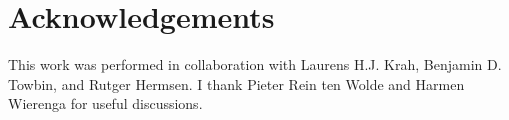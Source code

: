 %


\section{Acknowledgements}

This work was performed in collaboration with Laurens H.J. Krah, Benjamin D. Towbin,  and Rutger Hermsen.
%
I thank Pieter Rein ten Wolde and Harmen Wierenga for useful discussions.






